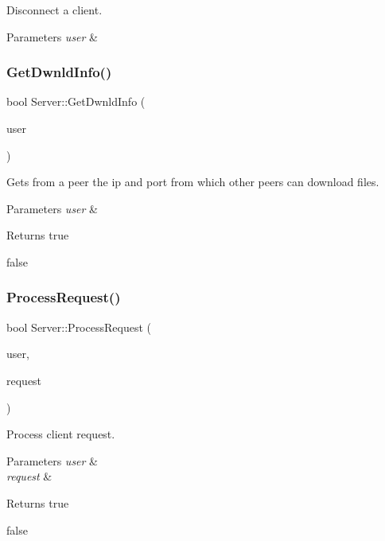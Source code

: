 Disconnect a client. 


\begin{DoxyParams}{Parameters}
{\em user} & \\
\hline
\end{DoxyParams}
\mbox{\label{class_server_a2529b191853b2e0915b1c99464c1c792}} 
\subsubsection{\texorpdfstring{Get\+Dwnld\+Info()}{GetDwnldInfo()}}
{\footnotesize\ttfamily bool Server\+::\+Get\+Dwnld\+Info (\begin{DoxyParamCaption}\item[{\mbox{\hyperlink{class_user}{User}} $\ast$}]{user }\end{DoxyParamCaption})}



Gets from a peer the ip and port from which other peers can download files. 


\begin{DoxyParams}{Parameters}
{\em user} & \\
\hline
\end{DoxyParams}
\begin{DoxyReturn}{Returns}
true 

false 
\end{DoxyReturn}
\mbox{\label{class_server_a8bf9735f86a6e7ec34ff0547388b7481}} 
\subsubsection{\texorpdfstring{Process\+Request()}{ProcessRequest()}}
{\footnotesize\ttfamily bool Server\+::\+Process\+Request (\begin{DoxyParamCaption}\item[{\mbox{\hyperlink{class_user}{User}} $\ast$}]{user,  }\item[{string}]{request }\end{DoxyParamCaption})}



Process client request. 


\begin{DoxyParams}{Parameters}
{\em user} & \\
\hline
{\em request} & \\
\hline
\end{DoxyParams}
\begin{DoxyReturn}{Returns}
true 

false 
\end{DoxyReturn}
\mbox{\label{class_server_ae46ab3bded0899d34fc891a42057ed0a}} 
